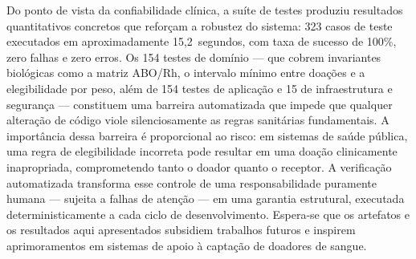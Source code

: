 Do ponto de vista da confiabilidade clínica, a suíte de testes produziu resultados quantitativos concretos que reforçam a robustez do sistema: 323 casos de teste executados em aproximadamente 15,2~segundos, com taxa de sucesso de 100\%, zero falhas e zero erros. Os 154 testes de domínio --- que cobrem invariantes biológicas como a matriz ABO/Rh, o intervalo mínimo entre doações e a elegibilidade por peso, além de 154 testes de aplicação e 15 de infraestrutura e segurança --- constituem uma barreira automatizada que impede que qualquer alteração de código viole silenciosamente as regras sanitárias fundamentais. A importância dessa barreira é proporcional ao risco: em sistemas de saúde pública, uma regra de elegibilidade incorreta pode resultar em uma doação clinicamente inapropriada, comprometendo tanto o doador quanto o receptor. A verificação automatizada transforma esse controle de uma responsabilidade puramente humana --- sujeita a falhas de atenção --- em uma garantia estrutural, executada deterministicamente a cada ciclo de desenvolvimento. Espera-se que os artefatos e os resultados aqui apresentados subsidiem trabalhos futuros e inspirem aprimoramentos em sistemas de apoio à captação de doadores de sangue.